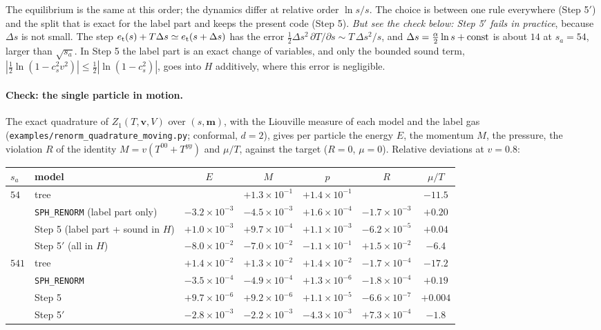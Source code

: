 \documentclass[11pt,aps,preprint,nofootinbib,superscriptaddress,tightenlines]{revtex4-2}
\let\oldparagraph\paragraph
\renewcommand{\paragraph}{\par\bigskip\oldparagraph}
\begin{document}
The equilibrium is the same at this order; the dynamics differ at relative order $\ln s/s$.  The choice is between one rule everywhere (Step 5$'$) and the split that
is exact for the label part and keeps the present code (Step 5).  \emph{But see the check below: Step 5$'$ fails in practice}, because $\Delta s$ is not small.  The step
$e_{\rm t}(s)+T\Delta s\simeq e_{\rm t}(s+\Delta s)$ has the error $\tfrac12\Delta s^2\,\partial T/\partial s\sim T\,\Delta s^2/s$, and $\Delta s=\tfrac\alpha2\ln s+{\rm const}$ is about $14$ at
$s_a=54$, larger than $\sqrt{s_a}$.  In Step 5 the label part is an exact change of variables, and only the bounded sound term, $|\tfrac12\ln(1-c_s^2v^2)|\le\tfrac12|\ln(1-c_s^2)|$,
goes into $H$ additively, where this error is negligible.

\paragraph{Check: the single particle in motion.}  The exact quadrature of $Z_1(T,\bm v,V)$ over $(s,\bm m)$, with the Liouville measure of each model and the label gas
(\nolinkurl{examples/renorm_quadrature_moving.py}; conformal, $d=2$), gives per particle the energy $E$, the momentum $M$, the pressure, the violation $R$ of the
identity $M=v(T^{00}+T^{yy})$ and $\mu/T$, against the target ($R=0$, $\mu=0$).  Relative deviations at $v=0.8$:
\begin{center}
\small
\begin{tabular}{llccccc}
\toprule
$s_a$ & model & $E$ & $M$ & $p$ & $R$ & $\mu/T$ \\
\midrule
$54$ & tree & & $+1.3\times10^{-1}$ & $+1.4\times10^{-1}$ & & $-11.5$ \\
 & \texttt{SPH\_RENORM} (label part only) & $-3.2\times10^{-3}$ & $-4.5\times10^{-3}$ & $+1.6\times10^{-4}$ & $-1.7\times10^{-3}$ & $+0.20$ \\
 & Step 5 (label part + sound in $H$) & $+1.0\times10^{-3}$ & $+9.7\times10^{-4}$ & $+1.1\times10^{-3}$ & $-6.2\times10^{-5}$ & $+0.04$ \\
 & Step 5$'$ (all in $H$) & $-8.0\times10^{-2}$ & $-7.0\times10^{-2}$ & $-1.1\times10^{-1}$ & $+1.5\times10^{-2}$ & $-6.4$ \\
\midrule
$541$ & tree & $+1.4\times10^{-2}$ & $+1.3\times10^{-2}$ & $+1.4\times10^{-2}$ & $-1.7\times10^{-4}$ & $-17.2$ \\
 & \texttt{SPH\_RENORM} & $-3.5\times10^{-4}$ & $-4.9\times10^{-4}$ & $+1.3\times10^{-6}$ & $-1.8\times10^{-4}$ & $+0.19$ \\
 & Step 5 & $+9.7\times10^{-6}$ & $+9.2\times10^{-6}$ & $+1.1\times10^{-5}$ & $-6.6\times10^{-7}$ & $+0.004$ \\
 & Step 5$'$ & $-2.8\times10^{-3}$ & $-2.2\times10^{-3}$ & $-4.3\times10^{-3}$ & $+7.3\times10^{-4}$ & $-1.8$ \\
\bottomrule
\end{tabular}
\end{center}
\end{document}
